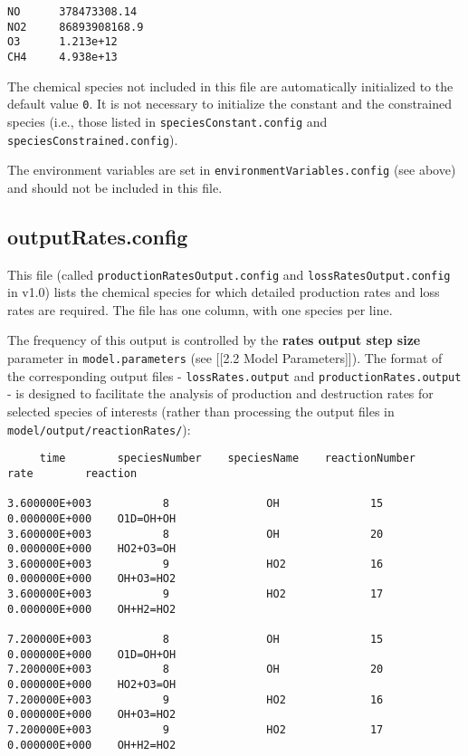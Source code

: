 \begin{verbatim}
NO      378473308.14
NO2     86893908168.9
O3      1.213e+12
CH4     4.938e+13
\end{verbatim}

The chemical species not included in this file are automatically
initialized to the default value \texttt{0}. It is not necessary to
initialize the constant and the constrained species (i.e., those listed
in \texttt{speciesConstant.config} and
\texttt{speciesConstrained.config}).

The environment variables are set in
\texttt{environmentVariables.config} (see above) and should not be
included in this file.

\hypertarget{outputrates.config}{%
\subsection{outputRates.config}\label{outputrates.config}}

This file (called \texttt{productionRatesOutput.config} and
\texttt{lossRatesOutput.config} in v1.0) lists the chemical species for
which detailed production rates and loss rates are required. The file
has one column, with one species per line.

The frequency of this output is controlled by the \textbf{rates output
step size} parameter in \texttt{model.parameters} (see {[}{[}2.2 Model
Parameters{]}{]}). The format of the corresponding output files -
\texttt{lossRates.output} and \texttt{productionRates.output} - is
designed to facilitate the analysis of production and destruction rates
for selected species of interests (rather than processing the output
files in \texttt{model/output/reactionRates/}):

\begin{verbatim}
     time        speciesNumber    speciesName    reactionNumber         rate        reaction

3.600000E+003           8               OH              15         0.000000E+000    O1D=OH+OH
3.600000E+003           8               OH              20         0.000000E+000    HO2+O3=OH
3.600000E+003           9               HO2             16         0.000000E+000    OH+O3=HO2
3.600000E+003           9               HO2             17         0.000000E+000    OH+H2=HO2

7.200000E+003           8               OH              15         0.000000E+000    O1D=OH+OH
7.200000E+003           8               OH              20         0.000000E+000    HO2+O3=OH
7.200000E+003           9               HO2             16         0.000000E+000    OH+O3=HO2
7.200000E+003           9               HO2             17         0.000000E+000    OH+H2=HO2
\end{verbatim}

